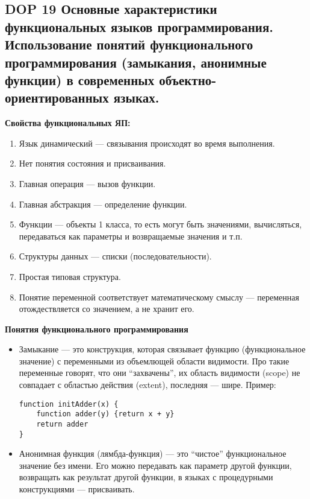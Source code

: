 \subsection{DOP 19 Основные  характеристики  функциональных  языков  программирования.  Использование  понятий функционального  программирования  (замыкания,  анонимные функции)  в  современных  объектно-ориентированных языках.}

\textbf{Свойства функциональных ЯП:}
\begin{enumerate}
    \item Язык динамический --- связывания происходят во время выполнения.
    \item Нет понятия состояния и присваивания.
    \item Главная операция --- вызов функции.
    \item Главная абстракция --- определение функции.
    \item Функции --- объекты 1 класса, то есть могут быть значениями, вычисляться, передаваться как параметры и возвращаемые значения и т.п.
    \item Структуры данных --- списки (последовательности).
    \item Простая типовая структура.
    \item Понятие переменной соответствует математическому смыслу --- переменная отождествляется со значением, а не хранит его.
\end{enumerate}

\textbf{Понятия функционального программирования}

\begin{itemize}
    \item Замыкание --- это конструкция, которая связывает функцию (функциональное значение) с переменными из объемлющей области видимости.
    Про такие переменные говорят, что они ``захвачены'', их область видимости (scope) не совпадает с областью действия (extent), последняя --- шире.
    Пример:
    \begin{lstlisting}
function initAdder(x) {
    function adder(y) {return x + y}
    return adder
}
    \end{lstlisting}
    \item Анонимная функция (лямбда-функция) --- это ``чистое'' функциональное значение без имени. 
    Его можно передавать как параметр другой функции, возвращать как результат другой функции, в языках с процедурными конструкциями --- присваивать.
\end{itemize}

